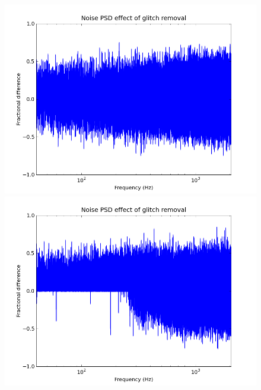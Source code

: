 \begin{figure}
  \includegraphics[width=0.5\linewidth]{figures/detchar/spectra_diffs_without_glitch}
  \includegraphics[width=0.5\linewidth]{figures/detchar/spectra_diffs}
  \caption[] {
  \label{f:}
}
\end{figure}%





